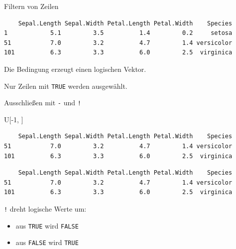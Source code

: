\documentclass[
  10pt,
  ignorenonframetext,
  aspectratio=169,
]{beamer}
\newenvironment{Shaded}{}{}
\newcommand{\DecValTok}[1]{\textcolor[rgb]{0.25,0.63,0.44}{#1}}
\newcommand{\NormalTok}[1]{#1}
\newcommand{\SpecialCharTok}[1]{\textcolor[rgb]{0.25,0.44,0.63}{#1}}
\newcommand{\StringTok}[1]{\textcolor[rgb]{0.25,0.44,0.63}{#1}}
\providecommand{\tightlist}{%
  \setlength{\itemsep}{0pt}\setlength{\parskip}{0pt}}
\begin{document}
\begin{frame}[fragile]{Filtern von Zeilen}
\label{filtern-von-zeilen}
\begin{Shaded}
\end{Shaded}

\begin{verbatim}
    Sepal.Length Sepal.Width Petal.Length Petal.Width    Species
1            5.1         3.5          1.4         0.2     setosa
51           7.0         3.2          4.7         1.4 versicolor
101          6.3         3.3          6.0         2.5  virginica
\end{verbatim}

Die Bedingung erzeugt einen logischen Vektor.

Nur Zeilen mit \texttt{TRUE} werden ausgewählt.
\end{frame}

\begin{frame}[fragile]{Ausschließen mit \texttt{-} und \texttt{!}}
\label{ausschlieuxdfen-mit---und}
\begin{Shaded}
\begin{Highlighting}[]
\NormalTok{U[}\SpecialCharTok{{-}}\DecValTok{1}\NormalTok{, ]}
\end{Highlighting}
\end{Shaded}

\begin{verbatim}
    Sepal.Length Sepal.Width Petal.Length Petal.Width    Species
51           7.0         3.2          4.7         1.4 versicolor
101          6.3         3.3          6.0         2.5  virginica
\end{verbatim}

\begin{Shaded}
\end{Shaded}

\begin{verbatim}
    Sepal.Length Sepal.Width Petal.Length Petal.Width    Species
51           7.0         3.2          4.7         1.4 versicolor
101          6.3         3.3          6.0         2.5  virginica
\end{verbatim}

\texttt{!} dreht logische Werte um:

\begin{itemize}
\tightlist
\item
  aus \texttt{TRUE} wird \texttt{FALSE}
\item
  aus \texttt{FALSE} wird \texttt{TRUE}
\end{itemize}
\end{frame}
\end{document}
